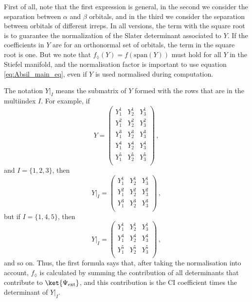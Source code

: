 \documentclass[a4paper,11pt]{article}
\begin{document}
First of all, note that the first expression is general, in the second we consider the separation between $\alpha$ and $\beta$ orbitals, and in the third we consider the separation between orbitals of different irreps.
In all versions, the term with the square root is to guarantee the normalization of the Slater determinant associated to $Y$.
If the coefficients in $Y$ are for an orthonormal set of orbitals, the term in the square root is one.
But we note that $f_\lozenge(Y) = f(\text{span}(Y))$ must hold for all $Y$ in the Stiefel manifold, and the normalisation factor is important to use equation \eqref{eq:Absil_main_eq}, even if $Y$ is used normalised during computation.

The notation $Y\big|_I$ means the submatrix of $Y$ formed with the rows that are in the multiindex $I$.
For example, if
\begin{equation}
  Y =
  \begin{pmatrix}
    Y^1_1 & Y^1_2 & Y^1_3\\
    Y^2_1 & Y^2_2 & Y^2_3\\
    Y^3_1 & Y^3_2 & Y^3_3\\
    Y^4_1 & Y^4_2 & Y^4_3\\
    Y^5_1 & Y^5_2 & Y^5_3\\
  \end{pmatrix}\,,
\end{equation}
and $I=\{1, 2, 3\}$, then
\begin{equation}
  Y\big|_I =
  \begin{pmatrix}
    Y^1_1 & Y^1_2 & Y^1_3\\
    Y^2_1 & Y^2_2 & Y^2_3\\
    Y^3_1 & Y^3_2 & Y^3_3\\
  \end{pmatrix}\,,
\end{equation}
but if $I=\{1, 4, 5\}$, then
\begin{equation}
  Y\big|_I =
  \begin{pmatrix}
    Y^1_1 & Y^1_2 & Y^1_3\\
    Y^4_1 & Y^4_2 & Y^4_3\\
    Y^5_1 & Y^5_2 & Y^5_3\\
  \end{pmatrix}\,,
\end{equation}
and so on.
Thus, the first formula says that, after taking the normalisation into account, $f_\lozenge$ is calculated by summing the contribution of all determinants that contribute to $\ket{\Psi_\text{ext}}$, and this contribution is the CI coefficient times the determinant of $Y\big|_I$.
\end{document}
